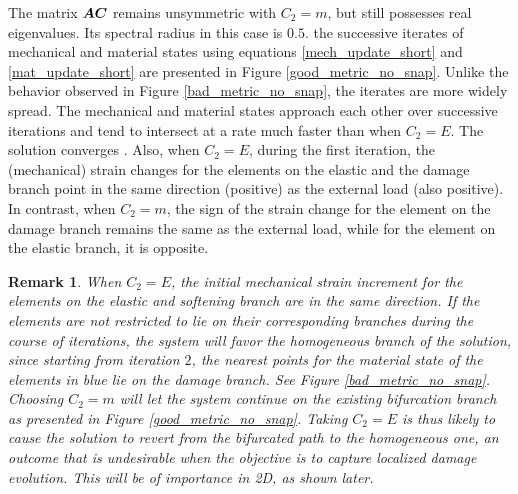 \documentclass[10pt]{cas-sc}
\newtheorem*{remark}{Remark}
\begin{document}
The matrix $\mbox{\boldmath $A$}  \mbox{\boldmath $C$} $ remains unsymmetric with $C_2=m$, but still possesses real eigenvalues. Its spectral radius in this case is $0.5$.  the successive iterates of mechanical and material states using equations \eqref{mech_update_short} and \eqref{mat_update_short} are presented in Figure \ref{good_metric_no_snap}. Unlike the behavior observed in Figure \ref{bad_metric_no_snap}, the iterates are more widely spread. The mechanical and material states approach each other over successive iterations and tend to intersect at a rate much faster than when $C_2=E$. The solution converges  . Also, when $C_2=E$, during the first iteration, the (mechanical) strain changes for the elements on the elastic and the damage branch point in the same direction (positive) as the external load (also positive). In contrast, when $C_2=m$, the sign of the strain change for the element on the damage branch remains the same as the external load, while for the element on the elastic branch, it is opposite. 

\begin{remark}
	When $C_2 = E$, the initial mechanical strain increment for the elements on the elastic and softening branch are in the same direction. If the elements are not restricted to lie on their corresponding branches during the course of iterations, the system will  favor the homogeneous branch of the solution, since starting from iteration $2$, the nearest points for the material state of the elements in blue lie on the damage branch. See Figure \ref{bad_metric_no_snap}. Choosing $C_2=m$ will let the system continue on the existing bifurcation branch as presented in Figure \ref{good_metric_no_snap}. Taking $C_2 = E$ is thus likely to cause the solution to revert from the bifurcated path to the homogeneous one, an outcome that is undesirable when the objective is to capture localized damage evolution. This will be of importance in 2D, as shown later.
\end{remark}
\end{document}
